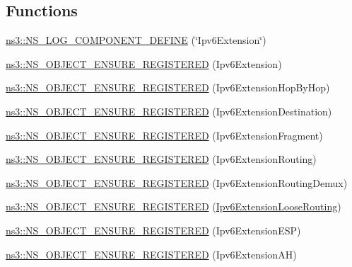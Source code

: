\subsection*{Functions}
\begin{DoxyCompactItemize}
\item 
\hyperlink{namespacens3_ae3a0c9d81dcd3e25f8860ebb2ff33742}{ns3\+::\+N\+S\+\_\+\+L\+O\+G\+\_\+\+C\+O\+M\+P\+O\+N\+E\+N\+T\+\_\+\+D\+E\+F\+I\+NE} (\char`\"{}Ipv6\+Extension\char`\"{})
\item 
\hyperlink{namespacens3_a9c1d0b1c7fecdd603394354b91be2127}{ns3\+::\+N\+S\+\_\+\+O\+B\+J\+E\+C\+T\+\_\+\+E\+N\+S\+U\+R\+E\+\_\+\+R\+E\+G\+I\+S\+T\+E\+R\+ED} (Ipv6\+Extension)
\item 
\hyperlink{namespacens3_a93db6a5e384bf565954025c3d1e8dea9}{ns3\+::\+N\+S\+\_\+\+O\+B\+J\+E\+C\+T\+\_\+\+E\+N\+S\+U\+R\+E\+\_\+\+R\+E\+G\+I\+S\+T\+E\+R\+ED} (Ipv6\+Extension\+Hop\+By\+Hop)
\item 
\hyperlink{namespacens3_ade54321feba7c6e95dfbbedc65a846d2}{ns3\+::\+N\+S\+\_\+\+O\+B\+J\+E\+C\+T\+\_\+\+E\+N\+S\+U\+R\+E\+\_\+\+R\+E\+G\+I\+S\+T\+E\+R\+ED} (Ipv6\+Extension\+Destination)
\item 
\hyperlink{namespacens3_a0c819189bc7d4c905a8918b9d330a48a}{ns3\+::\+N\+S\+\_\+\+O\+B\+J\+E\+C\+T\+\_\+\+E\+N\+S\+U\+R\+E\+\_\+\+R\+E\+G\+I\+S\+T\+E\+R\+ED} (Ipv6\+Extension\+Fragment)
\item 
\hyperlink{namespacens3_aa55bd6b5b7b054948af1418fe749dcca}{ns3\+::\+N\+S\+\_\+\+O\+B\+J\+E\+C\+T\+\_\+\+E\+N\+S\+U\+R\+E\+\_\+\+R\+E\+G\+I\+S\+T\+E\+R\+ED} (Ipv6\+Extension\+Routing)
\item 
\hyperlink{namespacens3_ad75ce9083eca4f8eb91fb4b4b3522d7a}{ns3\+::\+N\+S\+\_\+\+O\+B\+J\+E\+C\+T\+\_\+\+E\+N\+S\+U\+R\+E\+\_\+\+R\+E\+G\+I\+S\+T\+E\+R\+ED} (Ipv6\+Extension\+Routing\+Demux)
\item 
\hyperlink{namespacens3_a62795fef7772459fc0d6af629efddc9f}{ns3\+::\+N\+S\+\_\+\+O\+B\+J\+E\+C\+T\+\_\+\+E\+N\+S\+U\+R\+E\+\_\+\+R\+E\+G\+I\+S\+T\+E\+R\+ED} (\hyperlink{classns3_1_1Ipv6L3Protocol_aa3cefd4bf01ad6e80cfae2da346cccc2}{Ipv6\+Extension\+Loose\+Routing})
\item 
\hyperlink{namespacens3_a16061423a91df98c32becf00b1ef4640}{ns3\+::\+N\+S\+\_\+\+O\+B\+J\+E\+C\+T\+\_\+\+E\+N\+S\+U\+R\+E\+\_\+\+R\+E\+G\+I\+S\+T\+E\+R\+ED} (Ipv6\+Extension\+E\+SP)
\item 
\hyperlink{namespacens3_a18b4007dd739917c60a9daa90951f2b1}{ns3\+::\+N\+S\+\_\+\+O\+B\+J\+E\+C\+T\+\_\+\+E\+N\+S\+U\+R\+E\+\_\+\+R\+E\+G\+I\+S\+T\+E\+R\+ED} (Ipv6\+Extension\+AH)
\end{DoxyCompactItemize}
